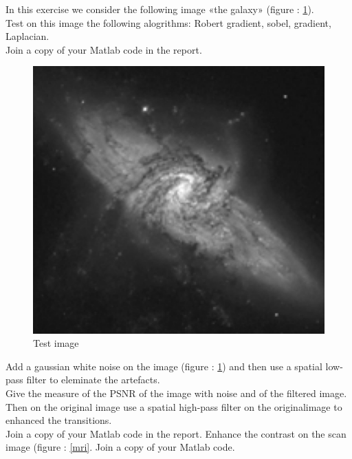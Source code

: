 \documentclass[12pt]{tdtp}
\begin{document}
\titre

\Exo

In this exercise we consider the following image «the galaxy» (figure : \ref{Galaxy}).\\
Test on this image the following alogrithms: Robert gradient, sobel, gradient, Laplacian.\\
Join a copy of your Matlab code in the report.


\begin{figure}[h!]
	\begin{center}
		\includegraphics[scale=0.5]{images/galaxy.png}
		\caption{Test image}
		\label{Galaxy}
	\end{center}
\end{figure}

\newpage 
\Exo


Add a gaussian white noise on the image (figure : \ref{Galaxy}) and then use a spatial low-pass filter to eleminate the artefacts.\\
Give the measure of the PSNR of the image with noise and of the filtered image.\\
Then on the original image use a spatial high-pass filter on the originalimage to enhanced the transitions.\\
Join a copy of your Matlab code in the report.
\newpage 
\Exo
Enhance the contrast on the scan image (figure : \ref{mri}.
Join a copy of your Matlab code.
\end{document}
